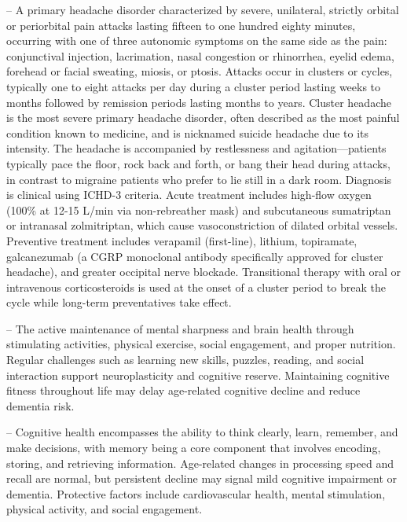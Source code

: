 -- A primary headache disorder characterized by severe, unilateral, strictly orbital or periorbital pain attacks lasting fifteen to one hundred eighty minutes, occurring with one of three autonomic symptoms on the same side as the pain: conjunctival injection, lacrimation, nasal congestion or rhinorrhea, eyelid edema, forehead or facial sweating, miosis, or ptosis. Attacks occur in clusters or cycles, typically one to eight attacks per day during a cluster period lasting weeks to months followed by remission periods lasting months to years. Cluster headache is the most severe primary headache disorder, often described as the most painful condition known to medicine, and is nicknamed suicide headache due to its intensity. The headache is accompanied by restlessness and agitation—patients typically pace the floor, rock back and forth, or bang their head during attacks, in contrast to migraine patients who prefer to lie still in a dark room. Diagnosis is clinical using ICHD-3 criteria. Acute treatment includes high-flow oxygen (100\% at 12-15 L/min via non-rebreather mask) and subcutaneous sumatriptan or intranasal zolmitriptan, which cause vasoconstriction of dilated orbital vessels. Preventive treatment includes verapamil (first-line), lithium, topiramate, galcanezumab (a CGRP monoclonal antibody specifically approved for cluster headache), and greater occipital nerve blockade. Transitional therapy with oral or intravenous corticosteroids is used at the onset of a cluster period to break the cycle while long-term preventatives take effect.

-- The active maintenance of mental sharpness and brain health through stimulating activities, physical exercise, social engagement, and proper nutrition. Regular challenges such as learning new skills, puzzles, reading, and social interaction support neuroplasticity and cognitive reserve. Maintaining cognitive fitness throughout life may delay age-related cognitive decline and reduce dementia risk.

-- Cognitive health encompasses the ability to think clearly, learn, remember, and make decisions, with memory being a core component that involves encoding, storing, and retrieving information. Age-related changes in processing speed and recall are normal, but persistent decline may signal mild cognitive impairment or dementia. Protective factors include cardiovascular health, mental stimulation, physical activity, and social engagement.

